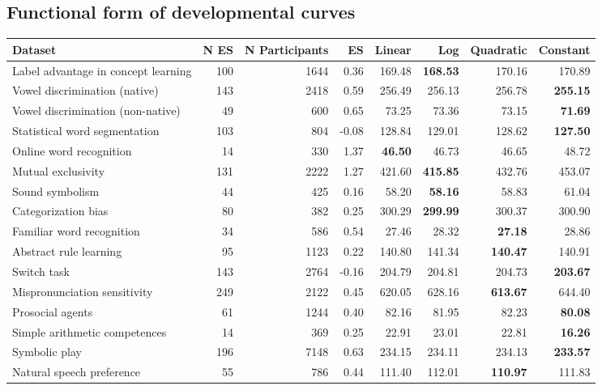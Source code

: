 \documentclass[10pt, letterpaper]{article}
\begin{document}
\hypertarget{functional-form-of-developmental-curves}{%
\subsection{Functional form of developmental
curves}\label{functional-form-of-developmental-curves}}

\begin{table}
\begin{tabular}{l|r|r|r|r|r|r|r}

\hline
\textbf{Dataset} & N ES & N Participants & ES & Linear & Log & Quadratic & Constant\\
\hline
Label advantage in concept learning & 100 & 1644 & 0.36 & 169.48 & \textbf{168.53} & 170.16 & 170.89\\
Vowel discrimination (native) & 143 & 2418 & 0.59 & 256.49 & 256.13 & 256.78 & \textbf{255.15}\\
Vowel discrimination (non-native) & 49 & 600 & 0.65 & 73.25 & 73.36 & 73.15 & \textbf{71.69}\\
Statistical word segmentation & 103 & 804 & -0.08 & 128.84 & 129.01 & 128.62 & \textbf{127.50}\\
Online word recognition & 14 & 330 & 1.37 & \textbf{46.50} & 46.73 & 46.65 & 48.72\\
Mutual exclusivity & 131 & 2222 & 1.27 & 421.60 & \textbf{415.85} & 432.76 & 453.07\\
Sound symbolism & 44 & 425 & 0.16 & 58.20 & \textbf{58.16} & 58.83 & 61.04\\
Categorization bias & 80 & 382 & 0.25 & 300.29 & \textbf{299.99} & 300.37 & 300.90\\
Familiar word recognition & 34 & 586 & 0.54 & 27.46 & 28.32 & \textbf{27.18} & 28.86\\
Abstract rule learning & 95 & 1123 & 0.22 & 140.80 & 141.34 & \textbf{140.47} & 140.91\\
Switch task & 143 & 2764 & -0.16 & 204.79 & 204.81 & 204.73 & \textbf{203.67}\\
Mispronunciation sensitivity & 249 & 2122 & 0.45 & 620.05 & 628.16 & \textbf{613.67} & 644.40\\
Prosocial agents & 61 & 1244 & 0.40 & 82.16 & 81.95 & 82.23 & \textbf{80.08}\\
Simple arithmetic competences & 14 & 369 & 0.25 & 22.91 & 23.01 & 22.81 & \textbf{16.26}\\
Symbolic play & 196 & 7148 & 0.63 & 234.15 & 234.11 & 234.13 & \textbf{233.57}\\
Natural speech preference & 55 & 786 & 0.44 & 111.40 & 112.01 & \textbf{110.97} & 111.83\\

\end{tabular}
\end{table}
\end{document}
